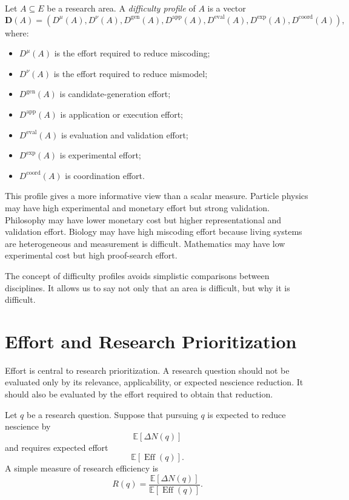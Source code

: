 \begin{definition}
Let \(A\subseteq E\) be a research area. A \emph{difficulty profile} of \(A\) is a vector
\[
\mathbf{D}(A)
=
\left(
D^{\mu}(A),
D^{\nu}(A),
D^{\mathrm{gen}}(A),
D^{\mathrm{app}}(A),
D^{\mathrm{eval}}(A),
D^{\mathrm{exp}}(A),
D^{\mathrm{coord}}(A)
\right),
\]
where:
\begin{itemize}
    \item \(D^{\mu}(A)\) is the effort required to reduce miscoding;
    \item \(D^{\nu}(A)\) is the effort required to reduce mismodel;
    \item \(D^{\mathrm{gen}}(A)\) is candidate-generation effort;
    \item \(D^{\mathrm{app}}(A)\) is application or execution effort;
    \item \(D^{\mathrm{eval}}(A)\) is evaluation and validation effort;
    \item \(D^{\mathrm{exp}}(A)\) is experimental effort;
    \item \(D^{\mathrm{coord}}(A)\) is coordination effort.
\end{itemize}
\end{definition}

This profile gives a more informative view than a scalar measure. Particle physics may have high experimental and monetary effort but strong validation. Philosophy may have lower monetary cost but higher representational and validation effort. Biology may have high miscoding effort because living systems are heterogeneous and measurement is difficult. Mathematics may have low experimental cost but high proof-search effort.

The concept of difficulty profiles avoids simplistic comparisons between disciplines. It allows us to say not only that an area is difficult, but why it is difficult.

\section{Effort and Research Prioritization}
\label{sec:effort_research_prioritization}

Effort is central to research prioritization. A research question should not be evaluated only by its relevance, applicability, or expected nescience reduction. It should also be evaluated by the effort required to obtain that reduction.

Let \(q\) be a research question. Suppose that pursuing \(q\) is expected to reduce nescience by
\[
\mathbb{E}[\Delta N(q)]
\]
and requires expected effort
\[
\mathbb{E}[\operatorname{Eff}(q)].
\]
A simple measure of research efficiency is
\[
R(q)=
\frac{\mathbb{E}[\Delta N(q)]}{\mathbb{E}[\operatorname{Eff}(q)]}.
\]

